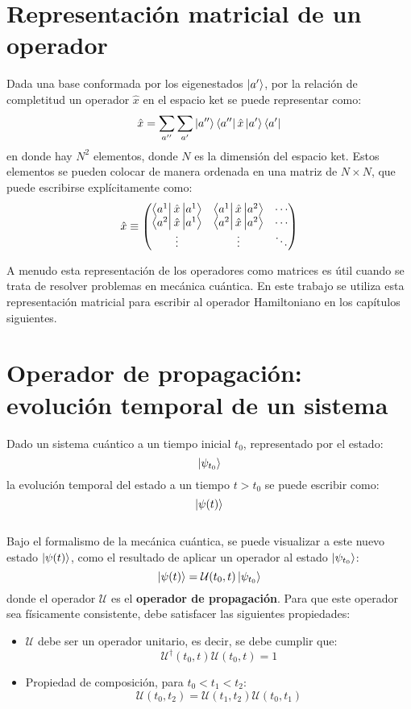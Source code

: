 \section{Representación matricial de un operador}
Dada una base conformada por los eigenestados $\ket{a'}$, por la relación de completitud un operador $\hat{x}$ en el espacio ket se puede representar como:
\begin{equation}
  \label{eq:xhat}
  \hat{x} = \sum_{a''}\sum_{a'}\ket{a''}\bra{a''}\hat{x}\ket{a'}\bra{a'}
\end{equation}
en donde hay $N^2$ elementos, donde $N$ es la dimensión del espacio ket. Estos elementos se pueden colocar de manera ordenada en una matriz de $N \times N$, que puede escribirse explícitamente como:
\begin{equation}
\hat{x}\equiv
\begin{pmatrix}
  \bra{a^1}\hat{x}\ket{a^1} & \bra{a^1}\hat{x}\ket{a^2} & \cdots \\
  \bra{a^2}\hat{x}\ket{a^1} & \bra{a^2}\hat{x}\ket{a^2} & \cdots \\
  \vdots & \vdots & \ddots
\end{pmatrix}
\label{eq:xmatrix}
\end{equation}

A menudo esta representación de los operadores como matrices es útil cuando se trata de resolver problemas en mecánica cuántica. En este trabajo se utiliza esta representación matricial para escribir al operador Hamiltoniano en los capítulos siguientes. 

\section{Operador de propagación: evolución temporal de un sistema}

Dado un sistema cuántico a un tiempo inicial $t_0$, representado por el estado: $$\ket{\psi_{t_0}}$$ la evolución temporal del estado a un tiempo $t>t_0$ se puede escribir como: $$\ket{\psi(t)}$$
\\
Bajo el formalismo de la mecánica cuántica, se puede visualizar a este nuevo estado $\ket{\psi(t)}$, como el resultado de aplicar un operador al estado $\ket{\psi_{t_0}}$:
$$\ket{\psi(t)}=\mathcal{U}(t_0,t)\ket{\psi_{t_0}}$$
donde el operador $\mathcal{U}$ es el \textbf{operador de propagación}. Para que este operador sea físicamente consistente, debe satisfacer las siguientes propiedades:

\begin{itemize}[label=\textcolor{CTtitle}{\textbullet}]
\item $\mathcal{U}$ debe ser un operador unitario, es decir, se debe cumplir que: $$\mathcal{U}^\dag(t_0,t)\mathcal{U}(t_0,t)=1$$
\item Propiedad de composición, para $t_0<t_1<t_2$: $$\mathcal{U}(t_0,t_2) = \mathcal{U}(t_1,t_2)\mathcal{U}(t_0,t_1)$$  
\end{itemize}

